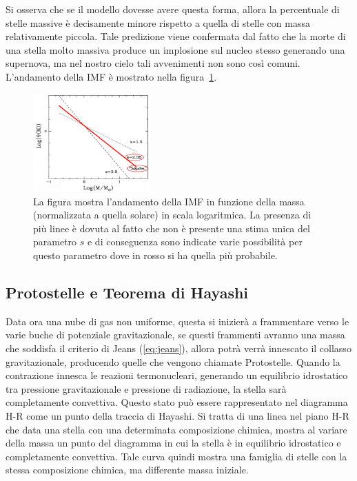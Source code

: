 Si osserva che se il modello dovesse avere questa forma, allora la percentuale di stelle massive è decisamente minore rispetto a quella di stelle con massa relativamente piccola. Tale predizione viene confermata dal fatto che la morte di una stella molto massiva produce un implosione sul nucleo stesso generando una supernova, ma nel nostro cielo tali avvenimenti non sono così comuni. L'andamento della IMF è mostrato nella figura~\ref{fig:IMF}.

\begin{figure}
    \centering
    \includegraphics[width = 0.4\textwidth]{immagini/IMF.png}
    \caption{La figura mostra l'andamento della IMF in funzione della massa (normalizzata a quella solare) in scala logaritmica. La presenza di più linee è dovuta al fatto che non è presente una stima unica del parametro $s$ e di conseguenza sono indicate varie possibilità per questo parametro dove in rosso si ha quella più probabile.}\label{fig:IMF}
\end{figure}
\subsection{Protostelle e Teorema di Hayashi}

Data ora una nube di gas non uniforme, questa si inizierà a frammentare verso le varie buche di potenziale gravitazionale, se questi frammenti avranno una massa che soddisfa il criterio di Jeans (\ref{eq:jeans}), allora potrà verrà innescato il collasso gravitazionale, producendo quelle che vengono chiamate Protostelle. Quando la contrazione innesca le reazioni termonucleari, generando un equilibrio idrostatico tra pressione gravitazionale e pressione di radiazione, la stella sarà completamente convettiva. Questo stato può essere rappresentato nel diagramma H-R come un punto della traccia di Hayashi. Si tratta di una linea nel piano H-R che data una stella con una determinata composizione chimica, mostra al variare della massa un punto del diagramma in cui la stella è in equilibrio idrostatico e completamente convettiva. Tale curva quindi mostra una famiglia di stelle con la stessa composizione chimica, ma differente massa iniziale.

